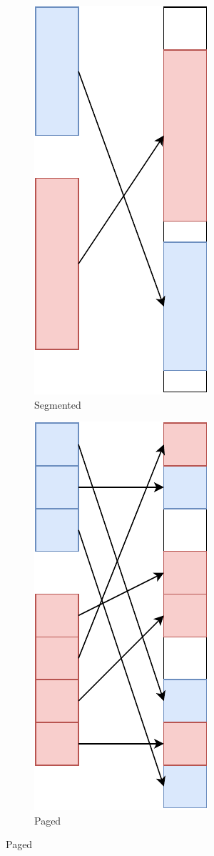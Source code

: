 \begin{figure}

  \begin{subfigure}[]{.45\linewidth}
    \centering
    \includegraphics[width=.5\linewidth]{img/segmented.pdf}
    \caption{Segmented}
  \end{subfigure}
  \hfill
  \begin{subfigure}[]{.45\linewidth}
    \centering
    \includegraphics[width=.5\linewidth]{img/paged.pdf}
    \caption{Paged}
  \end{subfigure}


\end{figure}
